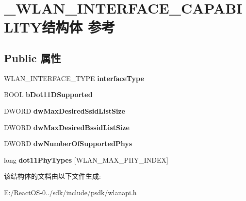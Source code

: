 \hypertarget{struct___w_l_a_n___i_n_t_e_r_f_a_c_e___c_a_p_a_b_i_l_i_t_y}{}\section{\+\_\+\+W\+L\+A\+N\+\_\+\+I\+N\+T\+E\+R\+F\+A\+C\+E\+\_\+\+C\+A\+P\+A\+B\+I\+L\+I\+T\+Y结构体 参考}
\label{struct___w_l_a_n___i_n_t_e_r_f_a_c_e___c_a_p_a_b_i_l_i_t_y}
\subsection*{Public 属性}
\begin{DoxyCompactItemize}
\item 
\mbox{\label{struct___w_l_a_n___i_n_t_e_r_f_a_c_e___c_a_p_a_b_i_l_i_t_y_a885400797d4db53c871679c7f27384d2}} 
W\+L\+A\+N\+\_\+\+I\+N\+T\+E\+R\+F\+A\+C\+E\+\_\+\+T\+Y\+PE {\bfseries interface\+Type}
\item 
\mbox{\label{struct___w_l_a_n___i_n_t_e_r_f_a_c_e___c_a_p_a_b_i_l_i_t_y_a16dd7da8fdf266558eb3332416d401b0}} 
B\+O\+OL {\bfseries b\+Dot11\+D\+Supported}
\item 
\mbox{\label{struct___w_l_a_n___i_n_t_e_r_f_a_c_e___c_a_p_a_b_i_l_i_t_y_a43cd5bab9cd745187b5d06db5977009a}} 
D\+W\+O\+RD {\bfseries dw\+Max\+Desired\+Ssid\+List\+Size}
\item 
\mbox{\label{struct___w_l_a_n___i_n_t_e_r_f_a_c_e___c_a_p_a_b_i_l_i_t_y_a08a9c571d99fdf59950896b6ea10df0d}} 
D\+W\+O\+RD {\bfseries dw\+Max\+Desired\+Bssid\+List\+Size}
\item 
\mbox{\label{struct___w_l_a_n___i_n_t_e_r_f_a_c_e___c_a_p_a_b_i_l_i_t_y_a994093c421fc8b957286a800f68f2191}} 
D\+W\+O\+RD {\bfseries dw\+Number\+Of\+Supported\+Phys}
\item 
\mbox{\label{struct___w_l_a_n___i_n_t_e_r_f_a_c_e___c_a_p_a_b_i_l_i_t_y_aaf27054053bf9cc2f4a0a2c8146c01df}} 
long {\bfseries dot11\+Phy\+Types} \mbox{[}W\+L\+A\+N\+\_\+\+M\+A\+X\+\_\+\+P\+H\+Y\+\_\+\+I\+N\+D\+EX\mbox{]}
\end{DoxyCompactItemize}


该结构体的文档由以下文件生成\+:\begin{DoxyCompactItemize}
\item 
E\+:/\+React\+O\+S-\/0../sdk/include/psdk/wlanapi.\+h\end{DoxyCompactItemize}
